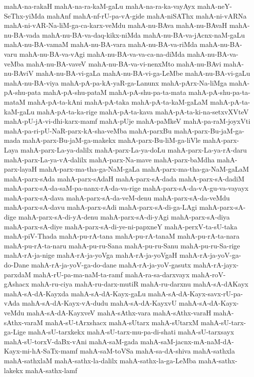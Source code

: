 {mahA-na-rakaH
mahA-na-ra-kaM-gaLu
mahA-na-ra-ka-vayAyx
mahA-neY-SeThx-yiMda
mahAnf
mahA-nf-rU-pa-vA-gide
mahA-niSAThx
mahA-ni-vARNa
mahA-ni-vAR-Na-liM-ga-ca-karx-veMdu
mahA-nu-BAva
mahA-nu-BAvaH
mahA-nu-BA-vada
mahA-nu-BA-va-daq-kikx-niMda
mahA-nu-BA-va-jAcnx-naM-gaLu
mahA-nu-BA-vamaM
mahA-nu-BA-vara
mahA-nu-BA-va-riMda
mahA-nu-BA-varu
mahA-nu-BA-va-vAgi
mahA-nu-BA-va-va-ca-na-diMda
mahA-nu-BA-va-veMba
mahA-nu-BA-vaveV
mahA-nu-BA-va-vi-nenxMto
mahA-nu-BAvi
mahA-nu-BAviV
mahA-nu-BA-vi-gaLa
mahA-nu-BA-vi-ga-LeMbe
mahA-nu-BA-vi-gaLu
mahA-nu-BA-viya
mahA-pA-pa-kA-yaR-ga-Lanunx
mahA-pArx-Na-liMga
mahA-pA-shu-pata
mahA-pA-shu-pataM
mahA-pA-shu-pa-ta-mata
mahA-pA-shu-pa-ta-mataM
mahA-pA-ta-kAni
mahA-pA-taka
mahA-pA-ta-kaM-gaLaM
mahA-pA-ta-kaM-gaLu
mahA-pA-ta-ka-rige
mahA-pA-ta-kava
mahA-pA-ta-ki-na-setxvXVteV
mahA-pU-jA-vi-dhi-karx-mamf
mahA-pUje
mahA-paMkeV
mahA-pa-raM-joyxVti
mahA-pa-ri-pU-NaR-parx-kA-sha-veMba
mahA-parxBu
mahA-parx-Bu-jaM-ga-mada
mahA-parx-Bu-jaM-ga-makekx
mahA-parx-Bu-liM-ga-liVle
mahA-parx-Laya
mahA-parx-La-ya-dalilx
mahA-parx-La-ya-doLu
mahA-parx-La-ya-rA-daru
mahA-parx-La-ya-vA-dalilx
mahA-parx-Na-mave
mahA-parx-baMdha
mahA-parx-layaH
mahA-parx-ma-tha-ga-NaM-gaLa
mahA-parx-ma-tha-ga-NaM-gaLaM
mahA-parx-sAda
mahA-parx-sAdaH
mahA-parx-sA-dada
mahA-parx-sA-dadiM
mahA-parx-sA-da-saM-pa-nanx-rA-da-va-rige
mahA-parx-sA-da-vA-gu-va-vayayx
mahA-parx-sA-dava
mahA-parx-sA-da-veM-denu
mahA-parx-sA-da-veMdu
mahA-parx-sA-davu
mahA-parx-sAdi
mahA-parx-sA-di-ga-LAgi
mahA-parx-sA-dige
mahA-parx-sA-di-yA-denu
mahA-parx-sA-di-yAgi
mahA-parx-sA-diya
mahA-parx-sA-diye
mahA-parx-sA-di-ye-ni-papxneY
mahA-perxV-ta-sU-taka
mahA-piV-Thada
mahA-pu-rA-tana
mahA-pu-rA-tanaM
mahA-pu-rA-ta-nara
mahA-pu-rA-ta-naru
mahA-pu-ru-Sana
mahA-pu-ru-Sanu
mahA-pu-ru-Sa-rige
mahA-rA-ja-nige
mahA-rA-ja-yoVga
mahA-rA-ja-yoVgaH
mahA-rA-ja-yoV-ga-do-Dane
mahA-rA-ja-yoV-ga-do-dane
mahA-rA-ja-yoV-gasutx
mahA-rA-jayx-parxdaM
mahA-rU-pa-ma-naM-ta-ramf
mahA-ra-sa-darxvayx
mahA-roV-gAshacx
mahA-ru-ciya
mahA-ru-darx-mutiR
mahA-ru-darxnu
mahA-sA-dAKayx
mahA-sA-dA-Kayxda
mahA-sA-dA-Kayx-gaLu
mahA-sA-dA-Kayx-savx-rU-pa-vAda
mahA-sA-dA-Kayx-vA-dudu
mahA-sA-dA-KayxvU
mahA-sA-dA-Kayx-veMdu
mahA-sA-dA-KayxveV
mahA-sAthx-vara
mahA-sAthx-varaH
mahA-sAthx-varaM
mahA-sU-tArxshacx
mahA-sUtarx
mahA-sUtarxM
mahA-sU-tarx-ga-Lige
mahA-sU-tarxkekx
mahA-sU-tarx-mu-pa-di-shati
mahA-sU-tarxsayx
mahA-sU-torxV-daBx-vAni
mahA-saM-gada
mahA-saM-jacnx-mA-naM-dA-Kayx-mi-hA-SaTx-mamf
mahA-saM-toVSa
mahA-sa-dA-shiva
mahA-sathxla
mahA-sathxlaM
mahA-sathx-la-dalilx
mahA-sathx-la-ga-LeMba
mahA-sathx-lakekx
mahA-sathx-lamf
}
